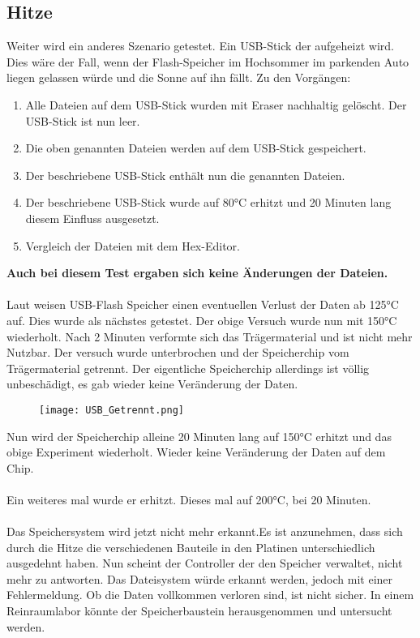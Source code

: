 \documentclass[10pt,a4paper]{article} %
\begin{document}
\subsection{Hitze}
Weiter wird ein anderes Szenario getestet. Ein USB-Stick der aufgeheizt wird. Dies wäre der Fall, wenn der Flash-Speicher im Hochsommer im parkenden Auto liegen gelassen würde und die Sonne auf ihn fällt. Zu den Vorgängen:
\begin{enumerate}
\item Alle Dateien auf dem USB-Stick wurden mit Eraser nachhaltig gelöscht. Der USB-Stick ist nun \glqq leer\grqq{}.
\item Die oben genannten Dateien werden auf dem USB-Stick gespeichert.
\item Der beschriebene USB-Stick enthält nun die genannten Dateien.
\item Der beschriebene USB-Stick wurde auf 80°C erhitzt und 20 Minuten lang diesem Einfluss ausgesetzt.
\item Vergleich der Dateien mit dem Hex-Editor. 
\end{enumerate}
\textbf{Auch bei diesem Test ergaben sich keine Änderungen der Dateien.}\\\\

\newpage
Laut \cite{125} weisen USB-Flash Speicher einen eventuellen Verlust der Daten ab 125°C auf. Dies wurde als nächstes getestet. Der obige Versuch wurde nun mit 150°C wiederholt. Nach 2 Minuten verformte sich das Trägermaterial und ist nicht mehr Nutzbar. Der versuch wurde unterbrochen und der Speicherchip vom Trägermaterial getrennt. Der eigentliche Speicherchip allerdings ist völlig unbeschädigt, es gab wieder keine Veränderung der Daten. 


\begin{figure}[ht]
\label{Bild}
	\centering
	 \texttt{[image: USB\_Getrennt.png]}
\end{figure}

\newpage
Nun wird der Speicherchip alleine 20 Minuten lang auf 150°C erhitzt und das obige Experiment wiederholt. Wieder keine Veränderung der Daten auf dem Chip.
\\\\
Ein weiteres mal wurde er erhitzt. Dieses mal auf 200°C, bei 20 Minuten.\\\\
Das Speichersystem wird jetzt nicht mehr erkannt.Es ist anzunehmen, dass sich durch die Hitze die verschiedenen Bauteile in den Platinen unterschiedlich ausgedehnt haben. Nun scheint der Controller der den Speicher verwaltet, nicht mehr zu antworten. Das Dateisystem würde erkannt werden, jedoch mit einer Fehlermeldung. Ob die Daten vollkommen verloren sind, ist nicht sicher. In einem Reinraumlabor könnte der Speicherbaustein herausgenommen und untersucht werden. \cite{Wiki}
\end{document}

